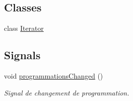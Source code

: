 \subsection*{Classes}
\begin{DoxyCompactItemize}
\item 
class \hyperlink{class_programmation_manager_1_1_iterator}{Iterator}
\end{DoxyCompactItemize}
\subsection*{Signals}
\begin{DoxyCompactItemize}
\item 
void \hyperlink{class_programmation_manager_ad6f6dbec484d80425f498460650a0649}{programmations\+Changed} ()
\begin{DoxyCompactList}\small\item\em Signal de changement de programmation. \end{DoxyCompactList}\end{DoxyCompactItemize}

